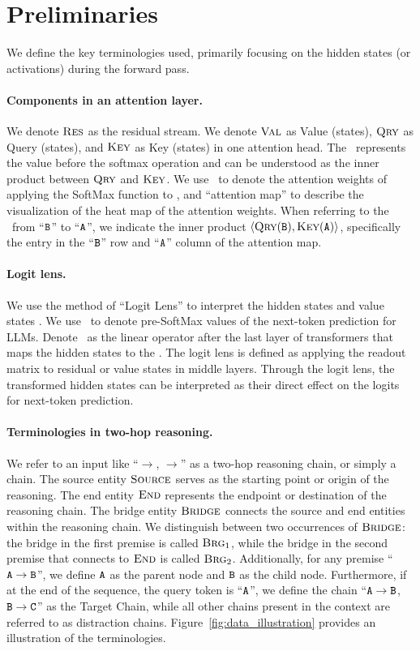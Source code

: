 \section{Preliminaries}
\label{sec:prelim}
\label{sec:term}
We define the key terminologies used, primarily focusing on the hidden states (or activations) during the forward pass. 

\paragraph{Components in an attention layer.} We denote $\textsc{Res}$ as the residual stream. We denote $\textsc{Val}$ as Value (states), $\textsc{Qry}$ as Query (states), and $\textsc{Key}$ as Key (states) in one attention head. The \attlogit~represents the value before the softmax operation and can be understood as the inner product between  $\textsc{Qry}$  and  $\textsc{Key}$. We use \Attn~to denote the attention weights of applying the SoftMax function to \attlogit, and ``attention map'' to describe the visualization of the heat map of the attention weights. When referring to the \attlogit~from ``$\texttt{B}$'' to  ``$\texttt{A}$'', we indicate the inner product  $\langle\textsc{Qry}(\texttt{B}), \textsc{Key}(\texttt{A})\rangle$, specifically the entry in the ``$\texttt{B}$'' row and ``$\texttt{A}$'' column of the attention map.

\paragraph{Logit lens.} We use the method of ``Logit Lens'' to interpret the hidden states and value states \citep{belrose2023eliciting}. We use \logit~to denote pre-SoftMax values of the next-token prediction for LLMs. Denote \readout~as the linear operator after the last layer of transformers that maps the hidden states to the \logit. 
The logit lens is defined as applying the readout matrix to residual or value states in middle layers. Through the logit lens, the transformed hidden states can be interpreted as their direct effect on the logits for next-token prediction. 

\paragraph{Terminologies in two-hop reasoning.} We refer to an input like “\Src$\to$\brga, \brgb$\to$\Ed” as a two-hop reasoning chain, or simply a chain. The source entity $\textsc{Source}$ serves as the starting point or origin of the reasoning. The end entity $\textsc{End}$ represents the endpoint or destination of the reasoning chain. The bridge entity $\textsc{Bridge}$ connects the source and end entities within the reasoning chain. We distinguish between two occurrences of $\textsc{Bridge}$: the bridge in the first premise is called $\textsc{Brg$_1$}$, while the bridge in the second premise that connects to $\textsc{End}$ is called $\textsc{Brg$_2$}$. Additionally, for any premise ``$\texttt{A} \to \texttt{B}$'', we define $\texttt{A}$ as the parent node and $\texttt{B}$ as the child node. Furthermore, if at the end of the sequence, the query token is ``$\texttt{A}$'', we define the chain ``$\texttt{A} \to \texttt{B}$, $\texttt{B} \to \texttt{C}$'' as the Target Chain, while all other chains present in the context are referred to as distraction chains. Figure~\ref{fig:data_illustration} provides an illustration of the terminologies.

